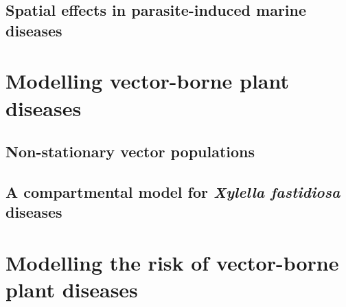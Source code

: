 \documentclass[
	10pt, %
	fleqn, %
	a4paper, %
]{LegrandOrangeBook}
\begin{document}
\chapter{Spatial effects in parasite-induced marine diseases}

 {
  \hypersetup{hidelinks}
  \part{Modelling vector-borne plant diseases}
 }

\chapterspaceabove{6.75cm}
\chapterspacebelow{7.25cm}

\chapter{Non-stationary vector populations}
%

\chapterspaceabove{6.75cm}
\chapterspacebelow{7.25cm}

\chapter{A compartmental model for \textit{Xylella fastidiosa} diseases}

 {
  \hypersetup{hidelinks}
  \part{Modelling the risk of vector-borne plant diseases}
 }
\end{document}
